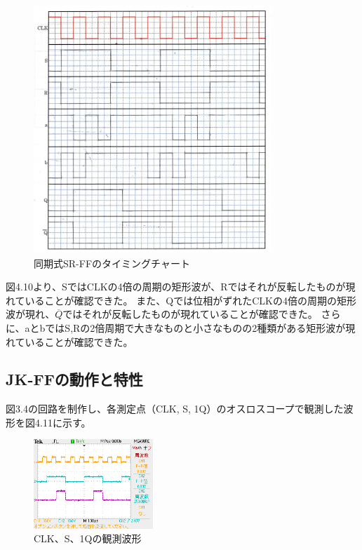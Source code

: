 \documentclass{jlreq}
\numberwithin{equation}{section}
\begin{document}
\begin{figure}[H]
  \centering
  \includegraphics[width=0.8\textwidth]{assets/srffchart.png}
  \caption{同期式SR-FFのタイミングチャート}
\end{figure}

図4.10より、SではCLKの4倍の周期の矩形波が、Rではそれが反転したものが現れていることが確認できた。
また、Qでは位相がずれたCLKの4倍の周期の矩形波が現れ、\(\overline{Q}\)ではそれが反転したものが現れていることが確認できた。
さらに、aとbではS,Rの2倍周期で大きなものと小さなものの2種類がある矩形波が現れていることが確認できた。

\subsection{JK-FFの動作と特性}
図3.4の回路を制作し、各測定点（CLK, S, 1Q）のオスロスコープで観測した波形を図4.11に示す。

\begin{figure}[H]
  \centering
  \includegraphics[width=0.4\textwidth]{assets/jkff.png}
  \caption{CLK、S、1Qの観測波形}
\end{figure}
\end{document}
